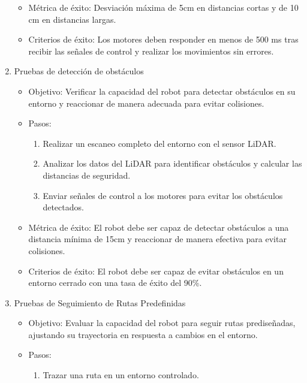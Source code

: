 \begin{enumerate}
\begin{itemize}
            \item M\'etrica de \'exito: Desviaci\'on m\'axima de 5cm en distancias cortas y de 10 cm en distancias largas.
            \item Criterios de \'exito: Los motores deben responder en menos de 500 ms
                tras recibir las se\~nales de control y realizar los movimientos sin errores.
        \end{itemize}
        \item Pruebas de detecci\'on de obst\'aculos
        \begin{itemize}
            \item Objetivo: Verificar la capacidad del robot para detectar obst\'aculos en su
                entorno y reaccionar de manera adecuada para evitar colisiones.
            \item Pasos:
                \begin{enumerate}
                    \item Realizar un escaneo completo del entorno con el sensor LiDAR.
                    \item Analizar los datos del LiDAR para identificar obst\'aculos y calcular
                        las distancias de seguridad.
                    \item Enviar se\~nales de control a los motores para evitar los obst\'aculos
                        detectados.
                \end{enumerate}
            \item M\'etrica de \'exito: El robot debe ser capaz de detectar obst\'aculos a una
                distancia m\'inima de 15cm y reaccionar de manera efectiva para evitar
                colisiones.
            \item Criterios de \'exito: El robot debe ser capaz de evitar obst\'aculos en un
                entorno cerrado con una tasa de \'exito del 90\%.
        \end{itemize}
        \item Pruebas de Seguimiento de Rutas Predefinidas
        \begin{itemize}
            \item Objetivo: Evaluar la capacidad del robot para seguir rutas predise\~nadas,
            ajustando su trayectoria en respuesta a cambios en el entorno.
            \item Pasos:
                \begin{enumerate}
                    \item Trazar una ruta en un entorno controlado.

\end{enumerate}
\end{itemize}
\end{enumerate}
